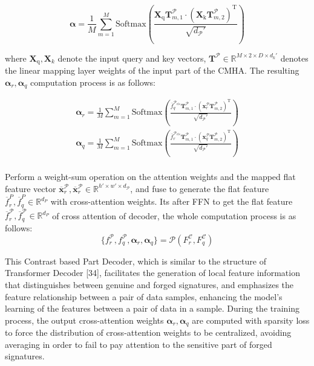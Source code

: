 \begin{equation}
\label{eq11}
  \boldsymbol{\alpha}= \frac{1}{M}\sum^M_{m=1} \text{Softmax}\left( \frac{\boldsymbol{X}_\text{q}\mathbf{T}^\mathcal{P}_{m, 1}\cdot (\boldsymbol{X}_\text{k}\mathbf{T}^\mathcal{P}_{m, 2})^\mathrm{T} }{\sqrt{d_\mathcal{P}'}} \right)
\end{equation}

where $\boldsymbol{X}_\text{q},\boldsymbol{X}_k$ denote the input query and key vectors, $\mathbf{T}^\mathcal{P} \in \mathbb{R}^{M\times 2\times D\times d_k′}$ denotes the linear mapping layer weights of the input part of the CMHA. The resulting $\boldsymbol{\alpha}_r,\boldsymbol{\alpha}_q$ computation process is as follows:

\begin{equation}
\label{eq12}
\begin{aligned}
  \boldsymbol{\alpha}_r = \frac{1}{M}\sum^M_{m=1} \text{Softmax}\left( \frac{\overline{f}_q^{\mathcal{P}_{cls}}\mathbf{T}^\mathcal{P}_{m, 1}\cdot (\boldsymbol{x}_r^\mathcal{P}\mathbf{T}^\mathcal{P}_{m, 2})^\mathrm{T} }{\sqrt{d_\mathcal{P}'}} \right) \\
  \boldsymbol{\alpha}_q = \frac{1}{M}\sum^M_{m=1} \text{Softmax}\left( \frac{\overline{f}_r^{\mathcal{P}_{cls}}\mathbf{T}^\mathcal{P}_{m, 1}\cdot (\boldsymbol{x}_q^\mathcal{P}\mathbf{T}^\mathcal{P}_{m, 2})^\mathrm{T} }{\sqrt{d_\mathcal{P}'}} \right) \\
\end{aligned}
\end{equation}

Perform a weight-sum operation on the attention weights and the mapped flat feature vector $\overline{\boldsymbol{x}}_r^\mathcal{P},\overline{\boldsymbol{x}}_r^\mathcal{P}\in \mathbb{R}^{h'\times w'\times d_\mathcal{P}}$, and fuse to generate the flat feature $\overline{f}_r^P,\overline{f}_q^P\in \mathbb{R}^{d_P}$ with cross-attention weights. Its after FFN to get the flat feature $\overline{f}_r^\mathcal{P},\overline{f}_q^\mathcal{P}\in \mathbb{R}^{d_P}$ of cross attention of decoder, the whole computation process is as follows:
\begin{equation}
\label{eq13}
  \{f_r^\mathcal{P},f_q^\mathcal{P},\boldsymbol{\alpha}_r,\boldsymbol{\alpha}_q \}=\mathcal{P}(F_r^\mathcal{C},F_q^\mathcal{C} )
\end{equation}

This Contrast based Part Decoder, which is similar to the structure of Transformer Decoder [34], facilitates the generation of local feature information that distinguishes between genuine and forged signatures, and emphasizes the feature relationship between a pair of data samples, enhancing the model's learning of the features between a pair of data in a sample. During the training process, the output cross-attention weights $\boldsymbol{\alpha}_r,\boldsymbol{\alpha}_q$ are computed with sparsity loss to force the distribution of cross-attention weights to be centralized, avoiding averaging in order to fail to pay attention to the sensitive part of forged signatures.

